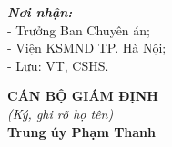 \documentclass[12pt,a4paper]{article}
\begin{document}
\vspace{0.8cm}

\noindent
\begin{minipage}[t]{0.45\textwidth}
    \small
    \textbf{\textit{Nơi nhận:}}\\
    - Trưởng Ban Chuyên án;\\
    - Viện KSMND TP. Hà Nội;\\
    - Lưu: VT, CSHS.
\end{minipage}
\hfill
\begin{minipage}[t]{0.5\textwidth}
    \begin{center}
        \small
        \textbf{CÁN BỘ GIÁM ĐỊNH}\\
        \textit{(Ký, ghi rõ họ tên)}\\[1.5cm]
        \textbf{Trung úy Phạm Thanh}
    \end{center}
\end{minipage}
\end{document}
